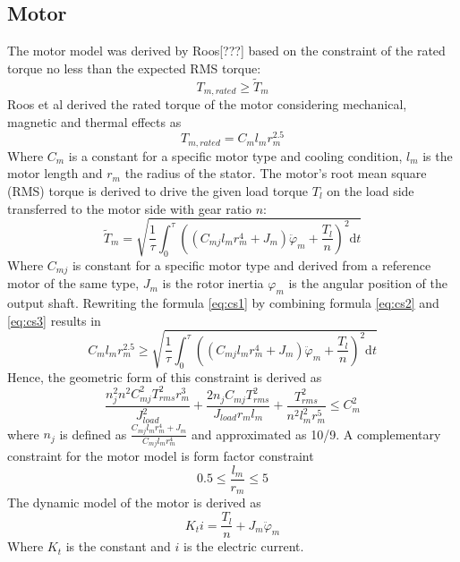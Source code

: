 \subsection*{Motor}
The motor model was derived by Roos[???] based on the constraint of the rated torque no less than the expected RMS torque:
\begin{equation} \label{eq:cs1}
T_{m,rated} \geq \tilde{T}_m
\end{equation}
Roos et al derived the rated torque of the motor considering mechanical, magnetic and thermal effects as
\begin{equation} \label{eq:cs2}
T_{m,rated}=C_ml_m r_m^{2.5}
\end{equation}
Where $C_m$ is a constant for a specific motor type and cooling condition, $l_m$ is the motor length and $r_m$ the radius of the stator. The motor$’$s root mean square (RMS) torque is derived to drive the given load torque $T_l$ on the load side transferred to the motor side with gear ratio $n$:
\begin{equation} \label{eq:cs3}
\tilde{T}_m=\sqrt{\frac{1}{\tau}\int_0^\tau ((C_{mj}l_m r_m^{4}+J_m)\ddot{\varphi}_m+\frac{T_l}{n})^2  \mathrm{d} t}
\end{equation}
Where $C_{mj}$ is constant for a specific motor type and derived from a reference motor of the same type, $J_m$ is the rotor inertia ${\varphi}_m$ is the angular position of the output shaft.
Rewriting the formula \ref{eq:cs1} by combining formula \ref{eq:cs2} and \ref{eq:cs3} results in
\begin{equation} \label{eq:cs4}
C_ml_m r_m^{2.5}\geq \sqrt{\frac{1}{\tau}\int_0^\tau ((C_{mj}l_m r_m^{4}+J_m)\ddot{\varphi}_m+\frac{T_l}{n})^2  \mathrm{d} t}
\end{equation}
Hence, the geometric form of this constraint is derived as
\begin{equation} \label{eq:cs5}
\frac{n_j^2 n^2 C_{mj}^2 T_{rms}^2 r_m^3}{J_{load}^2} + \frac{2 n_j C_{mj} T_{rms}^2}{J_{load} r_m l_m} + \frac{T_{rms}^2}{n^2 l_m^2 r_m^5}\leq C_m^2
\end{equation}
where $n_j$ is defined as $\frac{C_{mj}l_m r_m^{4}+J_m}{C_{mj}l_m r_m^{4}}$ and approximated as 10/9. 
A complementary constraint for the motor model is form factor constraint
\begin{equation} \label{eq:cs6}
0.5 \leq \frac{l_m}{r_m} \leq 5
\end{equation}
The dynamic model of the motor is derived as
\begin{equation} \label{eq:cs7}
K_ti= \frac{T_l}{n} + J_m\ddot{{\varphi}}_m
\end{equation}
Where $K_t$ is the constant and $i$ is the electric current.


